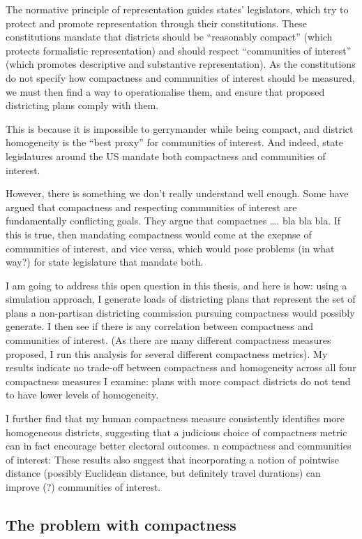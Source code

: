 \documentclass[]{article}
\begin{document}
The normative principle of representation guides states' legislators,
which try to protect and promote representation through their
constitutions. These constitutions mandate that districts should be
``reasonably compact'' (which protects formalistic representation) and
should respect ``communities of interest'' (which promotes descriptive
and substantive representation). As the constitutions do not specify how
compactness and communities of interest should be measured, we must then
find a way to operationalise them, and ensure that proposed districting
plans comply with them.

This is because it is impossible to gerrymander while being compact, and
district homogeneity is the ``best proxy'' for communities of interest.
And indeed, state legislatures around the US mandate both compactness
and communities of interest.

However, there is something we don't really understand well enough. Some
have argued that compactness and respecting communities of interest are
fundamentally conflicting goals. They argue that compactnes \ldots{}.
bla bla bla. If this is true, then mandating compactness would come at
the exepnse of communities of interest, and vice versa, which would pose
problems (in what way?) for state legislature that mandate both.

I am going to address this open question in this thesis, and here is
how: using a simulation approach, I generate loads of districting plans
that represent the set of plans a non-partisan districting commission
pursuing compactness would possibly generate. I then see if there is any
correlation between compactness and communities of interest. (As there
are many different compactness measures proposed, I run this analysis
for several different compactness metrics). My results indicate no
trade-off between compactness and homogeneity across all four
compactness measures I examine: plans with more compact districts do not
tend to have lower levels of homogeneity.

I further find that my human compactness measure consistently identifies
more homogeneous districts, suggesting that a judicious choice of
compactness metric can in fact encourage better electoral outcomes. n
compactness and communities of interest: These results also suggest that
incorporating a notion of pointwise distance (possibly Euclidean
distance, but definitely travel durations) can improve (?) communities
of interest.

\hypertarget{the-problem-with-compactness}{%
\subsection{The problem with
compactness}\label{the-problem-with-compactness}}
\end{document}
